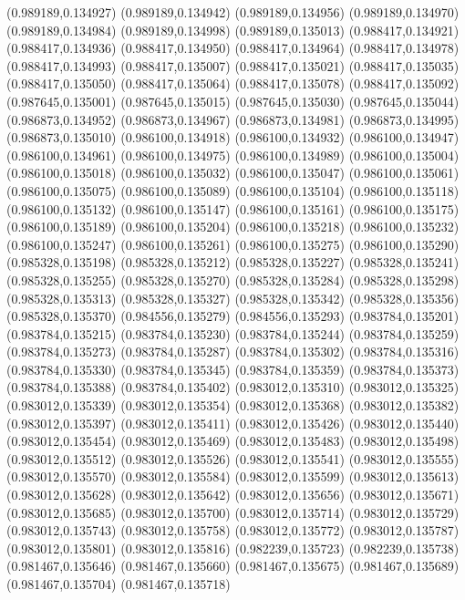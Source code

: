 (0.989189,0.134927)
(0.989189,0.134942)
(0.989189,0.134956)
(0.989189,0.134970)
(0.989189,0.134984)
(0.989189,0.134998)
(0.989189,0.135013)
(0.988417,0.134921)
(0.988417,0.134936)
(0.988417,0.134950)
(0.988417,0.134964)
(0.988417,0.134978)
(0.988417,0.134993)
(0.988417,0.135007)
(0.988417,0.135021)
(0.988417,0.135035)
(0.988417,0.135050)
(0.988417,0.135064)
(0.988417,0.135078)
(0.988417,0.135092)
(0.987645,0.135001)
(0.987645,0.135015)
(0.987645,0.135030)
(0.987645,0.135044)
(0.986873,0.134952)
(0.986873,0.134967)
(0.986873,0.134981)
(0.986873,0.134995)
(0.986873,0.135010)
(0.986100,0.134918)
(0.986100,0.134932)
(0.986100,0.134947)
(0.986100,0.134961)
(0.986100,0.134975)
(0.986100,0.134989)
(0.986100,0.135004)
(0.986100,0.135018)
(0.986100,0.135032)
(0.986100,0.135047)
(0.986100,0.135061)
(0.986100,0.135075)
(0.986100,0.135089)
(0.986100,0.135104)
(0.986100,0.135118)
(0.986100,0.135132)
(0.986100,0.135147)
(0.986100,0.135161)
(0.986100,0.135175)
(0.986100,0.135189)
(0.986100,0.135204)
(0.986100,0.135218)
(0.986100,0.135232)
(0.986100,0.135247)
(0.986100,0.135261)
(0.986100,0.135275)
(0.986100,0.135290)
(0.985328,0.135198)
(0.985328,0.135212)
(0.985328,0.135227)
(0.985328,0.135241)
(0.985328,0.135255)
(0.985328,0.135270)
(0.985328,0.135284)
(0.985328,0.135298)
(0.985328,0.135313)
(0.985328,0.135327)
(0.985328,0.135342)
(0.985328,0.135356)
(0.985328,0.135370)
(0.984556,0.135279)
(0.984556,0.135293)
(0.983784,0.135201)
(0.983784,0.135215)
(0.983784,0.135230)
(0.983784,0.135244)
(0.983784,0.135259)
(0.983784,0.135273)
(0.983784,0.135287)
(0.983784,0.135302)
(0.983784,0.135316)
(0.983784,0.135330)
(0.983784,0.135345)
(0.983784,0.135359)
(0.983784,0.135373)
(0.983784,0.135388)
(0.983784,0.135402)
(0.983012,0.135310)
(0.983012,0.135325)
(0.983012,0.135339)
(0.983012,0.135354)
(0.983012,0.135368)
(0.983012,0.135382)
(0.983012,0.135397)
(0.983012,0.135411)
(0.983012,0.135426)
(0.983012,0.135440)
(0.983012,0.135454)
(0.983012,0.135469)
(0.983012,0.135483)
(0.983012,0.135498)
(0.983012,0.135512)
(0.983012,0.135526)
(0.983012,0.135541)
(0.983012,0.135555)
(0.983012,0.135570)
(0.983012,0.135584)
(0.983012,0.135599)
(0.983012,0.135613)
(0.983012,0.135628)
(0.983012,0.135642)
(0.983012,0.135656)
(0.983012,0.135671)
(0.983012,0.135685)
(0.983012,0.135700)
(0.983012,0.135714)
(0.983012,0.135729)
(0.983012,0.135743)
(0.983012,0.135758)
(0.983012,0.135772)
(0.983012,0.135787)
(0.983012,0.135801)
(0.983012,0.135816)
(0.982239,0.135723)
(0.982239,0.135738)
(0.981467,0.135646)
(0.981467,0.135660)
(0.981467,0.135675)
(0.981467,0.135689)
(0.981467,0.135704)
(0.981467,0.135718)
